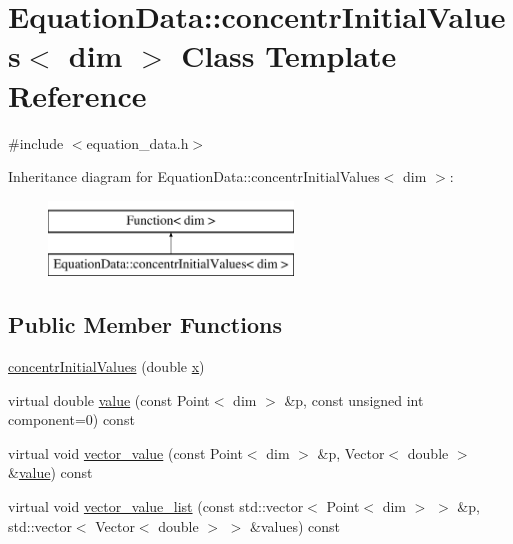 \hypertarget{class_equation_data_1_1concentr_initial_values}{}\section{Equation\+Data\+:\+:concentr\+Initial\+Values$<$ dim $>$ Class Template Reference}
\label{class_equation_data_1_1concentr_initial_values}


{\ttfamily \#include $<$equation\+\_\+data.\+h$>$}

Inheritance diagram for Equation\+Data\+:\+:concentr\+Initial\+Values$<$ dim $>$\+:\begin{figure}[H]
\begin{center}
\leavevmode
\includegraphics[height=2.000000cm]{class_equation_data_1_1concentr_initial_values}
\end{center}
\end{figure}
\subsection*{Public Member Functions}
\begin{DoxyCompactItemize}
\item 
\hyperlink{class_equation_data_1_1concentr_initial_values_a5cb78258be9e0add00e7155fdb7e16e6}{concentr\+Initial\+Values} (double \hyperlink{class_equation_data_1_1concentr_initial_values_a3f0d3b7f4b1d02908f38d83d855718ea}{x})
\item 
virtual double \hyperlink{class_equation_data_1_1concentr_initial_values_a9b67003948ed9e58aece49100f657515}{value} (const Point$<$ dim $>$ \&p, const unsigned int component=0) const 
\item 
virtual void \hyperlink{class_equation_data_1_1concentr_initial_values_a45d0821e98083c9b5dc4b089dc796cb5}{vector\+\_\+value} (const Point$<$ dim $>$ \&p, Vector$<$ double $>$ \&\hyperlink{class_equation_data_1_1concentr_initial_values_a9b67003948ed9e58aece49100f657515}{value}) const 
\item 
virtual void \hyperlink{class_equation_data_1_1concentr_initial_values_a9f23343e83a28890a58ac750ce3379a4}{vector\+\_\+value\+\_\+list} (const std\+::vector$<$ Point$<$ dim $>$ $>$ \&p, std\+::vector$<$ Vector$<$ double $>$ $>$ \&values) const 
\end{DoxyCompactItemize}
